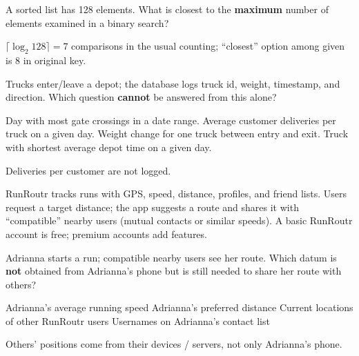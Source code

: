 \question[5]
A sorted list has 128 elements. What is closest to the \textbf{maximum} number of elements examined in a binary search?
\begin{choices}
\end{choices}
\begin{solution}
  \(\lceil\log_2 128\rceil = 7\) comparisons in the usual counting; ``closest'' option among given is 8 in original key.
\end{solution}

\question[5]
Trucks enter/leave a depot; the database logs truck id, weight, timestamp, and direction. Which question \textbf{cannot} be answered from this alone?
\begin{choices}
  \choice Day with most gate crossings in a date range.
  \CorrectChoice Average customer deliveries per truck on a given day.
  \choice Weight change for one truck between entry and exit.
  \choice Truck with shortest average depot time on a given day.
\end{choices}
\begin{solution}
  Deliveries per customer are not logged.
\end{solution}





\newcommand{\runroutrstem}{%
RunRoutr tracks runs with GPS, speed, distance, profiles, and friend lists. Users request a target distance; the app suggests a route and shares it with ``compatible'' nearby users (mutual contacts or similar speeds).
A basic RunRoutr account is free; premium accounts add features.
}

\question[5]
\runroutrstem

Adrianna starts a run; compatible nearby users see her route. Which datum is \textbf{not} obtained from Adrianna's phone but is still needed to share her route with others?
\begin{choices}
  \choice Adrianna's average running speed
  \choice Adrianna's preferred distance
  \CorrectChoice Current locations of other RunRoutr users
  \choice Usernames on Adrianna's contact list
\end{choices}
\begin{solution}
  Others' positions come from their devices / servers, not only Adrianna's phone.
\end{solution}



\newpage



